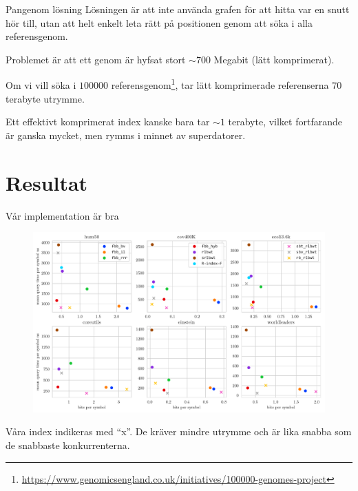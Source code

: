 \documentclass[11pt, aspectratio=169, table]{beamer}
\begin{document}
\begin{frame}{Pangenom lösning}
\setlength{\parskip}{\fill}
Lösningen är att inte använda grafen för att hitta var en snutt hör till, utan att helt 
enkelt leta rätt på positionen genom att söka i alla referensgenom.

Problemet är att ett genom är hyfsat stort $\sim 700$ Megabit (lätt komprimerat).

Om vi vill söka i $100000$ referensgenom\footnote{\url{https://www.genomicsengland.co.uk/initiatives/100000-genomes-project}}, 
tar lätt komprimerade referenserna $70$ terabyte utrymme.

Ett effektivt komprimerat index kanske bara tar $\sim 1$ terabyte, vilket fortfarande är ganska mycket, 
men rymms i minnet av superdatorer.
\end{frame}

\section{Resultat}
\begin{frame}{Vår implementation är bra}
\begin{figure}
\centering
\includegraphics[trim={0 8cm 0 0},clip,width=\textwidth]{amd_pattern_count_30.pdf}
\end{figure}

Våra index indikeras med ``x''. De kräver mindre utrymme och är lika snabba som de snabbaste konkurrenterna.
\end{frame}

%
\end{document}
